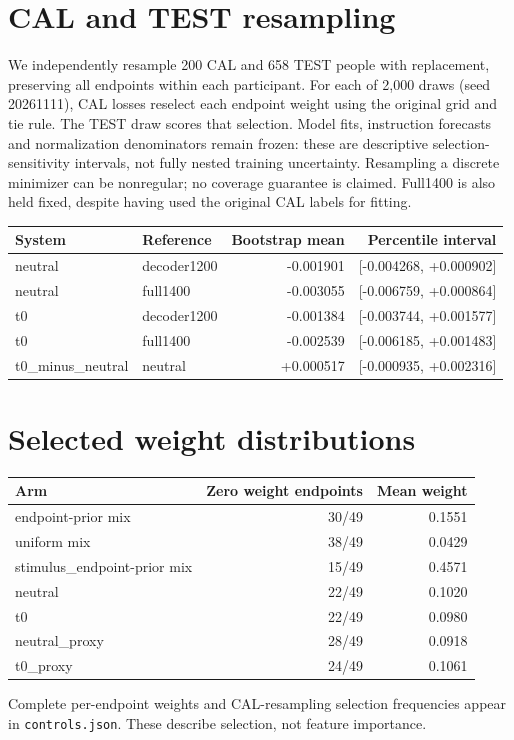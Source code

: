\documentclass[10pt]{article}
\begin{document}
\section{CAL and TEST resampling}
We independently resample 200 CAL and 658 TEST people with replacement, preserving all endpoints within each participant. For each of 2,000 draws (seed 20261111), CAL losses reselect each endpoint weight using the original grid and tie rule. The TEST draw scores that selection. Model fits, instruction forecasts and normalization denominators remain frozen: these are descriptive selection-sensitivity intervals, not fully nested training uncertainty. Resampling a discrete minimizer can be nonregular; no coverage guarantee is claimed. Full1400 is also held fixed, despite having used the original CAL labels for fitting.
\begin{longtable}{llrr}\toprule System & Reference & Bootstrap mean & Percentile interval\\\midrule
neutral & decoder1200 & -0.001901 & [-0.004268, +0.000902]\\
neutral & full1400 & -0.003055 & [-0.006759, +0.000864]\\
t0 & decoder1200 & -0.001384 & [-0.003744, +0.001577]\\
t0 & full1400 & -0.002539 & [-0.006185, +0.001483]\\
t0\_minus\_neutral & neutral & +0.000517 & [-0.000935, +0.002316]\\
\bottomrule\end{longtable}\section{Selected weight distributions}\begin{longtable}{lrr}\toprule Arm & Zero weight endpoints & Mean weight\\\midrule
endpoint-prior mix & 30/49 & 0.1551\\
uniform mix & 38/49 & 0.0429\\
stimulus\_endpoint-prior mix & 15/49 & 0.4571\\
neutral & 22/49 & 0.1020\\
t0 & 22/49 & 0.0980\\
neutral\_proxy & 28/49 & 0.0918\\
t0\_proxy & 24/49 & 0.1061\\
\bottomrule\end{longtable}
Complete per-endpoint weights and CAL-resampling selection frequencies appear in \texttt{controls.json}. These describe selection, not feature importance.
\end{document}
